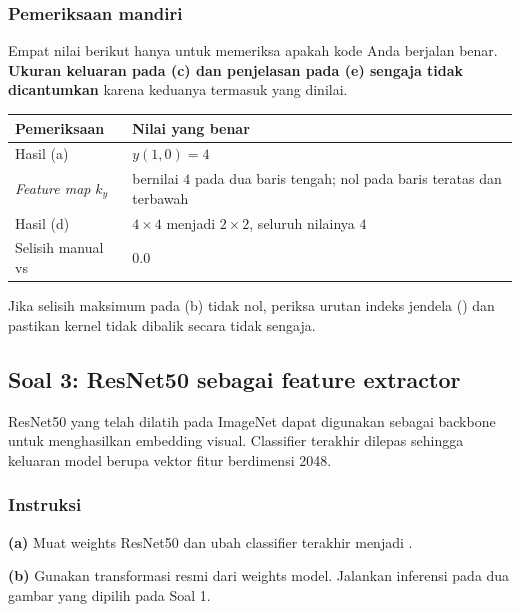 \documentclass[12pt, a4paper]{article}
\begin{document}
\subsubsection{Pemeriksaan mandiri}
\label{sec:soal2-hasil}

Empat nilai berikut hanya untuk memeriksa apakah kode Anda berjalan benar. \textbf{Ukuran keluaran pada (c) dan penjelasan pada (e) sengaja tidak dicantumkan} karena keduanya termasuk yang dinilai.

\begin{center}
\small
\begin{tabular}{@{}L{4.2cm} L{8.5cm}@{}}
  \toprule \textbf{Pemeriksaan} & \textbf{Nilai yang benar} \\
  \midrule
  Hasil (a) & $y(1,0) = 4$ \\
  \emph{Feature map} $k_y$ & bernilai $4$ pada dua baris tengah; nol pada baris teratas dan terbawah \\
  Hasil (d) & $4 \times 4$ menjadi $2 \times 2$, seluruh nilainya $4$ \\
  Selisih manual vs  & $0.0$ \\
  \bottomrule
\end{tabular}
\end{center}

Jika selisih maksimum pada (b) tidak nol, periksa urutan indeks jendela () dan pastikan kernel tidak dibalik secara tidak sengaja.

\subsection{Soal 3: ResNet50 sebagai feature extractor}
\label{sec:soal2-resnet}

ResNet50 yang telah dilatih pada ImageNet dapat digunakan sebagai backbone untuk menghasilkan embedding visual. Classifier terakhir dilepas sehingga keluaran model berupa vektor fitur berdimensi 2048.

\subsubsection{Instruksi}
\label{sec:soal2resnet-instruksi}

\textbf{(a)} Muat weights ResNet50 dan ubah classifier terakhir menjadi .

\textbf{(b)} Gunakan transformasi resmi dari weights model. Jalankan inferensi pada dua gambar yang dipilih pada Soal 1.
\end{document}
